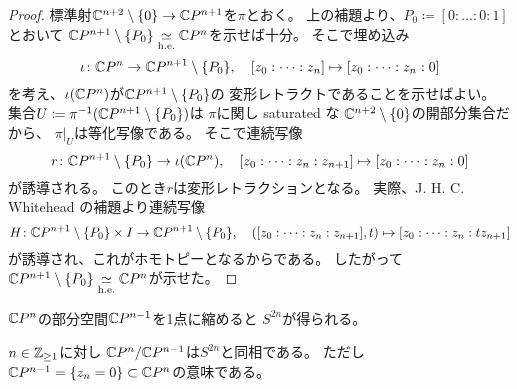 \documentclass[report]{jlreq}
\begin{document}
\begin{proof}
    標準射$\mathbb{C}^{n + 2} \setminus \{ 0 \} \to \mathbb{C} P^{n + 1}$を$\pi$とおく。
    上の補題より、$P_0 \coloneqq [0 : \dots : 0 : 1]$とおいて
    $\C P^{n + 1} \setminus \{ P_0 \} \simeqhe \C P^n$を示せば十分。
    そこで埋め込み
    \begin{equation}
        \iota \colon \mathbb{C} P^n \to \mathbb{C} P^{n + 1} \setminus \{ P_0 \},
        \quad
        [z_0 : \dots : z_n] \mapsto [z_0 : \dots : z_n : 0]
    \end{equation}
    を考え、$\iota(\mathbb{C} P^n)$が$\mathbb{C} P^{n + 1} \setminus \{ P_0 \}$の
    変形レトラクトであることを示せばよい。
    集合$U \coloneqq \pi^{-1}(\mathbb{C} P^{n + 1} \setminus \{ P_0 \})$は
    $\pi$に関し saturated な
    $\mathbb{C}^{n + 2} \setminus \{ 0 \}$の開部分集合だから、
    $\pi|_U$は等化写像である。
    そこで連続写像
    \begin{equation}
        r \colon \mathbb{C} P^{n + 1} \setminus \{ P_0 \} \to \iota(\mathbb{C} P^n),
        \quad
        [z_0 : \dots : z_n : z_{n + 1}] \mapsto [z_0 : \dots : z_n : 0]
    \end{equation}
    が誘導される。
    このとき$r$は変形レトラクションとなる。
    実際、J. H. C. Whitehead の補題より連続写像
    \begin{equation}
        H \colon \mathbb{C} P^{n + 1} \setminus \{ P_0 \} \times I
            \to \mathbb{C} P^{n + 1} \setminus \{ P_0 \},
        \quad
        ([z_0 : \dots : z_n : z_{n + 1}], t) \mapsto
            [z_0 : \dots : z_n : tz_{n + 1}]
    \end{equation}
    が誘導され、これがホモトピーとなるからである。
    したがって$\C P^{n + 1} \setminus \{ P_0 \} \simeqhe \C P^n$が示せた。
\end{proof}

$\mathbb{C} P^n$の部分空間$\mathbb{C} P^{n - 1}$を1点に縮めると
$S^{2n}$が得られる。

\begin{lemma}
    $n \in \mathbb{Z}_{\ge 1}$に対し
    $\mathbb{C} P^n / \mathbb{C} P^{n - 1}$は$S^{2n}$と同相である。
    ただし$\mathbb{C} P^{n - 1} = \{ z_n = 0 \} \subset \mathbb{C} P^n$の意味である。
\end{lemma}
\end{document}
